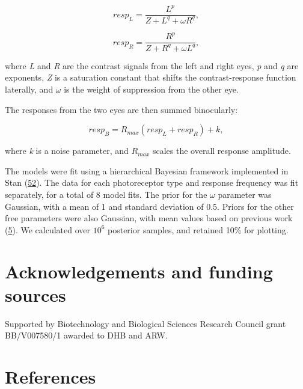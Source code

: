 \documentclass[
]{article}
\begin{document}
\begin{equation}
\label{eq:respL}
resp_L = \frac{L^p}{Z + L^q + \omega R^q},
\end{equation}

\begin{equation}
\label{eq:respR}
resp_R = \frac{R^p}{Z + R^q + \omega L^q},
\end{equation}

\noindent where \emph{L} and \emph{R} are the contrast signals from the left and right eyes, \emph{p} and \emph{q} are exponents, \emph{Z} is a saturation constant that shifts the contrast-response function laterally, and \(\omega\) is the weight of suppression from the other eye.

The responses from the two eyes are then summed binocularly:

\begin{equation}
\label{eq:respB}
resp_B = R_{max}(resp_L + resp_R) + k,
\end{equation}

\noindent where \emph{k} is a noise parameter, and \(R_{max}\) scales the overall response amplitude.

The models were fit using a hierarchical Bayesian framework implemented in Stan (\protect\hyperlink{ref-Carpenter2017}{52}). The data for each photoreceptor type and response frequency was fit separately, for a total of 8 model fits. The prior for the \(\omega\) parameter was Gaussian, with a mean of 1 and standard deviation of 0.5. Priors for the other free parameters were also Gaussian, with mean values based on previous work (\protect\hyperlink{ref-Segala2023}{5}). We calculated over \ensuremath{10^{6}} posterior samples, and retained 10\% for plotting.

\hypertarget{acknowledgements-and-funding-sources}{%
\section{Acknowledgements and funding sources}\label{acknowledgements-and-funding-sources}}

Supported by Biotechnology and Biological Sciences Research Council grant BB/V007580/1 awarded to DHB and ARW.

\hypertarget{references}{%
\section{References}\label{references}}
\end{document}
